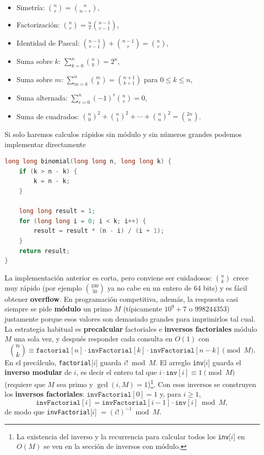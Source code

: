 \begin{itemize}
    \item Simetría: $\binom{n}{r} = \binom{n}{n-r}$,
    \item Factorización: $\binom{n}{r} = \frac{n}{r}\binom{n-1}{r-1}$,
    \item Identidad de Pascal: $\binom{n-1}{r-1} + \binom{n-1}{r} = \binom{n}{r}$,
    \item Suma sobre $k$: $\sum_{k=0}^{n}\binom{n}{k}=2^n$,
    \item Suma sobre $m$: $\sum_{m=k}^{n}\binom{m}{k}=\binom{n+1}{k+1}$ para $0\le k\le n$,
    \item Suma alternada: $\sum_{r=0}^{n} (-1)^r\binom{n}{r} = 0$,
    \item Suma de cuadrados: $\binom{n}{0}^2+\binom{n}{1}^2+\cdots+\binom{n}{n}^2=\binom{2n}{n}$.
\end{itemize}

Si solo haremos calculos rápidos sin módulo y sin números grandes podemos implementar directamente
\begin{lstlisting}[language=C++]
long long binomial(long long n, long long k) {
    if (k > n - k) {
        k = n - k;
    }

    long long result = 1;
    for (long long i = 0; i < k; i++) {
        result = result * (n - i) / (i + 1);
    }
    return result;
}
\end{lstlisting}
La implementación anterior es corta, pero conviene ser cuidadosos: $\binom{n}{k}$ crece muy rápido (por ejemplo $\binom{100}{50}$ ya no cabe en un entero de 64 bits) y es fácil obtener \textbf{overflow}. En programación competitiva, además, la respuesta casi siempre se pide \textbf{módulo} un primo $M$ (típicamente $10^9+7$ o $998244353$) justamente porque esos valores son demasiado grandes para imprimirlos tal cual. La estrategia habitual es \textbf{precalcular} factoriales e \textbf{inversos factoriales} módulo $M$ una sola vez, y después responder cada consulta en $O(1)$ con
\[
\binom{n}{k} \equiv \texttt{factorial}[n]\cdot \texttt{invFactorial}[k]\cdot \texttt{invFactorial}[n-k] \pmod M.
\]
En el precálculo, \texttt{factorial}[$i$] guarda $i!\bmod M$. El arreglo \texttt{inv}[$i$] guarda el \textbf{inverso modular} de $i$, es decir el entero tal que $i\cdot \texttt{inv}[i]\equiv 1\pmod M$ (requiere que $M$ sea primo y $\gcd(i,M)=1$)\footnote{La existencia del inverso y la recurrencia para calcular todos los \texttt{inv}[$i$] en $O(M)$ se ven en la sección de inversos con módulo.}. Con esos inversos se construyen los \textbf{inversos factoriales}: $\texttt{invFactorial}[0]=1$ y, para $i\ge 1$,
\[
\texttt{invFactorial}[i] = \texttt{invFactorial}[i-1]\cdot \texttt{inv}[i] \bmod M,
\]
de modo que \texttt{invFactorial}[$i$] $=(i!)^{-1}\bmod M$.


